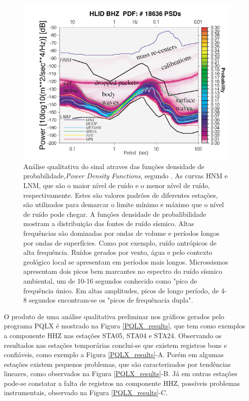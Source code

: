 \begin{figure}[!ht]
\centering
\includegraphics[scale=0.6]{Figs/mcnamura_buland.png}
\caption[Análise qualitativa do sinal atraves das funções densidade de probabilidade]{Análise qualitativa do sinal atraves das funções densidade de probabilidade,\textit{Power Density Functions}, segundo \cite{McNamara_Buland_2004}. As curvas HNM e LNM, que são o maior nível de ruído  e o menor nível de ruído, respectivamente. Estes são valores padrões de diferentes estações, são utilizados para demarcar o limite mínimo e máximo que o nível de ruído pode chegar. A funções densidade de probalibilidade mostram a distribuição das fontes de ruído sísmico. Altas frequências são dominadas por ondas de volume e períodos longos por ondas de superfícies. Como por exemplo, ruído antrópicos de alta frequência. Ruídos gerados por vento, água e pelo contexto geológico local se apresentam em períodos mais longos. Microssismos apresentam dois picos bem marcantes no espectro do ruído sísmico ambiental, um de 10-16 segundos conhecido como "pico de frequência único. Em altas amplitudes, picos de longo período, de 4-8 segundos encontram-se os "picos de frequênacia dupla".}
\label{PQLX}
\end{figure}

O produto de uma análise qualitativa preliminar nos gráficos gerados pelo programa PQLX é mostrado na Figura \ref{PQLX_results}, que tem como exemplos a componente HHZ nas estações STA05, STA04 e STA24. Observando os resultados nas estações temporárias conclui-se que existem registros bons e confiáveis, como exemplo a Figura \ref{PQLX_results}-A. Porém em algumas estações existem pequenos problemas, que são caracterizados por tendências lineares, como observados na Figura \ref{PQLX_results}-B. Já em outras estações pode-se constatar a falta de registros na componente HHZ,   possíveis problemas instrumentais, observado na Figura \ref{PQLX_results}-C.

